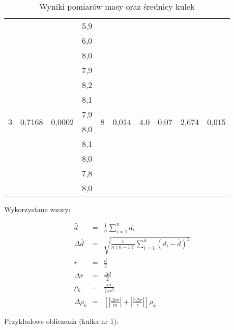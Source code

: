 \documentclass[wide,a4paper,titlepage,12pt]{mwart}
\begin{document}
\begin{table}[hp]
\begin{center}
\begin{tabular}{|c|c|c|c|c|c|c|c|c|c|}
            & & & 5,9 & & & & & &\\
            & & & 6,0 & & & & & &\\
          \hline
            \multirow{10}{*}{3} &  
            \multirow{10}{*}{0,7168} & 
            \multirow{10}{*}{0,0002} & 
            8,0 &  
            \multirow{10}{*}{8} &  
            \multirow{10}{*}{0,014} &  
            \multirow{10}{*}{4.0} &  
            \multirow{10}{*}{0,07} & 
            \multirow{10}{*}{2,674} &  
            \multirow{10}{*}{0,015} \\
            & & & 7,9 & & & & & &\\
            & & & 8,2 & & & & & &\\
            & & & 8,1 & & & & & &\\
            & & & 7,9 & & & & & &\\
            & & & 8,0 & & & & & &\\
            & & & 8,1 & & & & & &\\
            & & & 8,0 & & & & & &\\
            & & & 7,8 & & & & & &\\
            & & & 8,0 & & & & & &\\
          \hline
        \end{tabular}
        \caption{\label{rozmiary}Wyniki pomiarów masy oraz średnicy kulek}
      \end{center}
    \end{table}
    
    Wykorzystane wzory:
    
    \begin{eqnarray*}
      \bar{d} &=& \frac{1}{n} \sum_{i=1}^{n} d_i \\
      \Delta \bar{d} &=& \sqrt{\frac{1}{n(n-1)} \sum_{i=1}^{n} (d_i - \bar{d})^2} \\
      \bar{r} &=& \frac{\bar{d}}{2} \\
      \Delta \bar{r} &=& \frac{\Delta \bar{d}}{2} \\
      \rho_k &=& \frac{m}{\frac{4}{3} \pi r^3} \\
      \Delta \rho_k &=& \left [ \left | \frac{\Delta m}{m}\right | + \left | \frac{3\Delta r}{r}\right |\right] \rho_k
    \end{eqnarray*}
    
    Przykładowe obliczenia (kulka nr 1):
    
\end{document}
